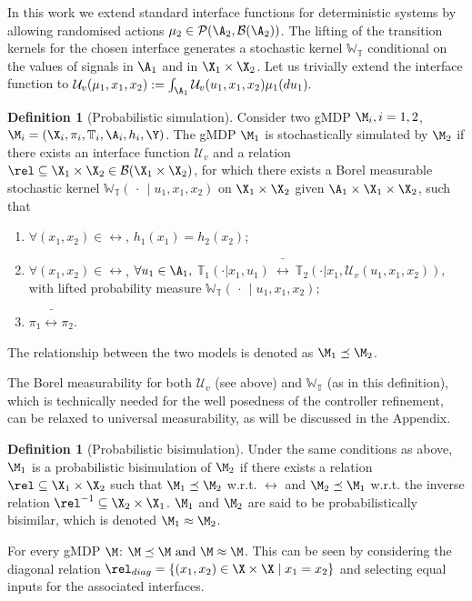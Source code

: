 \documentclass[letterpaper, 10 pt, conference]{amsart}
\theoremstyle{definition}
\newtheorem{defn}[definition]{Definition}
\theoremstyle{example}
\theoremstyle{remark}
\newcommand{\InF}{\mathcal{U}_{v}}
\newcommand{\Wt}{\mathbb{W}_{\mathbb{T}}}
\begin{document}
In this work we extend standard interface functions for deterministic systems by allowing randomised actions $\mu_2\in\mathcal P(\A_2, \mathcal B (\A_2))$. 
The lifting of the transition kernels for the chosen interface generates a stochastic kernel $\Wt$ conditional on the values of signals in $\A_1$ and in $\X_1\times\X_2$.  
Let us trivially extend the interface function to \(\InF(\mu_1,x_1,x_2):=\int_{\A_1}\InF(u_1,x_1,x_2)\mu_1(du_1).\) 
\begin{defn}[Probabilistic simulation]\label{def:pbsim}
Consider two gMDP $\M_i, i=1,2$, $\M_i = (\X_i,\pi_i ,\mathbb T_i,\A_i,h_i,\Y)$.    
The gMDP $\M_1$ is stochastically simulated by $\M_2$ if there exists an interface function $\InF$ and
a relation $\rel\subseteq \X_1\times \X_2\in\mathcal B(\X_1\times \X_2)$, for which there exists a Borel measurable stochastic kernel $\Wt(\,\cdot\,{\mid} u_1,x_1,x_2)$ on $\X_1\times\X_2$ given $\A_1\times\X_1\times\X_2$,
such that { \setlength{\parskip}{-1pt}\setlength{\parsep}{0pt}
\begin{enumerate}
\item $\forall (x_1,x_2)\in \rel$, $ h_1(x_1)=h_2(x_2)$;  
\item $\forall (x_1,x_2)\in \rel$, $\forall {u_1}\in \A_1,$  
\(\mathbb T_1(\cdot| x_1,u_1)\ \bar \rel\  \mathbb T_2(\cdot| x_1,\InF(u_1,x_1,x_2)),\) with lifted probability measure $\Wt(\,\cdot\,{\mid} u_1,x_1,x_2)$;  
\item $\pi_1\bar\rel \pi_2$.
\end{enumerate} }\noindent The relationship between the two models is denoted as $\M_1\preceq\M_2$.  
\end{defn}  
The Borel measurability for both $\InF$ (see above) and $\Wt$ (as in this definition), 
which is technically needed for the well posedness of the controller refinement, 
can be relaxed to universal measurability, as will be discussed in the Appendix.  
\begin{defn}[Probabilistic bisimulation]\label{def:pbbi}
Under the same conditions as above, 
$\M_1$ is a probabilistic bisimulation of $\M_2$ if there exists a   relation $\rel\subseteq \X_1\times \X_2$ such that $\M_1\preceq \M_2$ w.r.t. $\rel$ and $\M_2\preceq\M_1$ w.r.t. the inverse relation $\rel^{-1}\subseteq \X_2\times \X_1$.
$\M_1$ and $\M_2$ are said to be probabilistically bisimilar, 
which is denoted $\M_1\approx\M_2$.   
\end{defn}
For every gMDP $\M$: 
\(\M\preceq\M \textmd{ and } \M\approx\M\).
This can be seen by considering the diagonal relation $\rel_{diag}=\{(x_1,x_2)\in\X\times \X\mid x_1=x_2\}$ and selecting equal inputs  for the associated interfaces. 
\end{document}
